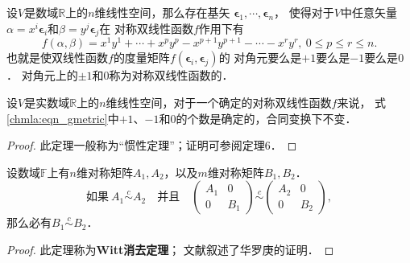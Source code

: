 \begin{corollary}\label{chmla:thm_pm1num}
    设$V$是数域$\mathbb{R}$上的$n$维线性空间，那么存在基矢
    $\boldsymbol{\epsilon}_1,\cdots,\boldsymbol{\epsilon}_n$，
    使得对于$V$中任意矢量
    $\alpha = x^i \boldsymbol{\epsilon}_i$和$\beta = y^j \boldsymbol{\epsilon}_j$在
    对称双线性函数$f$作用下有
    \begin{equation}\label{chmla:eqn_gmetric}
        f(\alpha,\beta)= x^1 y^1 + \cdots + x^p y^p
        -x^{p+1} y^{p+1} - \cdots - x^r y^r, \
        0 \leqslant p \leqslant r \leqslant n.
    \end{equation}
    也就是使双线性函数$f$的度量矩阵$f(\boldsymbol{\epsilon}_i,\boldsymbol{\epsilon}_j)$的
    对角元要么是$+1$要么是$-1$要么是$0$．
    对角元上的$\pm 1$和$0$称为对称双线性函数的． 
\end{corollary}
\begin{theorem}\label{chmla:thm_pm1num-fix}
    设$V$是实数域$\mathbb{R}$上的$n$维线性空间，对于一个确定的对称双线性函数$f$来说，
    式\eqref{chmla:eqn_gmetric}中$+1$、$-1$和$0$的个数是确定的，合同变换下不变．
\end{theorem}
\begin{proof}
    此定理一般称为“惯性定理”；证明可参阅\parencite[p.432]{qiuws-2019-v2}定理6．
\end{proof}


\begin{theorem}\label{chmla:thm_Witt-cancel}
    设数域$\mathbb{F}$上有$n$维对称矩阵$A_1,A_2$，以及$m$维对称矩阵$B_1,B_2$．
    \begin{equation}\label{chmla:eqn_Witt-cancel}
        \text{如果}\ A_1 \overset{c}{\sim} A_2 \quad \text{并且} \quad 
        \begin{pmatrix}  A_1 &0 \\ 0 & B_1  \end{pmatrix} \overset{c}{\sim}
        \begin{pmatrix}  A_2 &0 \\ 0 & B_2  \end{pmatrix},
    \end{equation}
    那么必有$B_1 \overset{c}{\sim} B_2$．
\end{theorem}
\begin{proof}
    此定理称为{\heiti \bfseries Witt消去定理}；
    文献\parencite[p.433]{qiuws-2019-v2}叙述了华罗庚的证明．
\end{proof}


